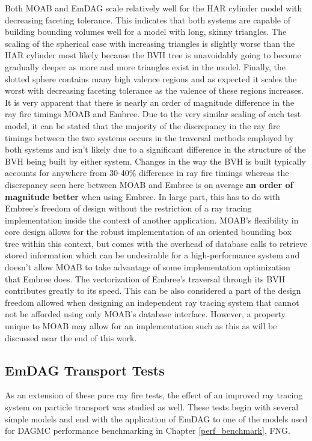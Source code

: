 Both MOAB and EmDAG scale relatively well for the HAR cylinder model with
decreasing faceting tolerance. This indicates that both systems are capable of
building bounding volumes well for a model with long, skinny triangles. The
scaling of the spherical case with increasing triangles is slightly worse than
the HAR cylinder most likely because the BVH tree is unavoidably going to
become gradually deeper as more and more triangles exist in the model. Finally,
the slotted sphere contains many high valence regions and as expected it scales
the worst with decreasing faceting tolerance as the valence of these regions
increases. It is very apparent that there is nearly an order of magnitude
difference in the ray fire timings MOAB and Embree. Due to the very similar
scaling of each test model, it can be stated that the majority of the
discrepancy in the ray fire timings between the two systems occurs in the
traversal methods employed by both systems and isn't likely due to a significant
difference in the structure of the BVH being built by either system. Changes in
the way the BVH is built typically accounts for anywhere from 30-40\% difference
in ray fire timings whereas the discrepancy seen here between MOAB and Embree is
on average \textbf{an order of magnitude better} when using Embree. In large
part, this has to do with Embree's freedom of design without the restriction of
a ray tracing implementation inside the context of another application. MOAB's
flexibility in core design allows for the robust implementation of an oriented
bounding box tree within this context, but comes with the overhead of database
calls to retrieve stored information which can be undesirable for a
high-performance system and doesn't allow MOAB to take advantage of some
implementation optimization that Embree does. The vectorization of Embree's
traversal through its BVH contributes greatly to its speed. This can be also
considered a part of the design freedom allowed when designing an independent
ray tracing system that cannot not be afforded using only MOAB's database
interface. However, a property unique to MOAB may allow for an implementation
such as this as will be discussed near the end of this work.

\subsection{EmDAG Transport Tests}
\label{subsec:emdag_transport}

As an extension of these pure ray fire tests, the effect of an improved ray
tracing system on particle transport was studied as well. These tests begin with
several simple models and end with the application of EmDAG to one of the models
used for DAGMC performance benchmarking in Chapter \ref{perf_benchmark}, FNG.

